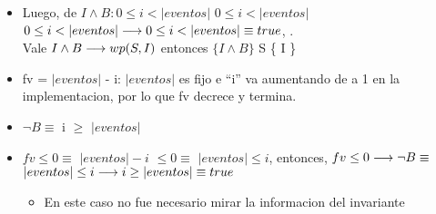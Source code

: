 \documentclass[10pt,a4paper]{article}
\begin{document}
\begin{proof*}
    \begin{itemize}
    \item{%
     Luego, de $I \land B: 0 \leq i < |eventos|$ \hspace{0.2cm}  \hspace{0.2cm} $0 \leq i < |eventos|$ \hspace{0.2cm}  \\
     $0 \leq i < |eventos| \longrightarrow 0 \leq i < |eventos| \equiv true$, \hspace{0.2cm} . \\
     \vspace{0.5cm}
    \hspace{4.2cm} Vale $I \land B \longrightarrow wp(S, I)$ \hspace{0.2cm} entonces \hspace{0.2cm} $\{ I \land B \}$ \hspace{0.1cm}S\hspace{0.1cm} \{ I \}
    }
    \end{itemize}
    \vspace{0.8cm}
    \begin{minipage}{3cm}
    \end{minipage}
    \begin{itemize}
    \vspace{0.2cm}
    \item fv = ${|eventos|}$ - i: ${|eventos|}$ es fijo e ``i'' va aumentando de a 1 en la implementacion, por lo que fv decrece y termina.
    \item $\neg  B \equiv$ \hspace{0.2cm} i \hspace{0.2cm} $\geq$
    \hspace{0.2cm}
    ${|eventos|}$
    \item {$fv \leq 0 \equiv$ \hspace{0.1cm} ${|eventos|} - i$ $\leq 0 \equiv$ \hspace{0.1cm} ${|eventos|} \leq i$}, \hspace{0.2cm} entonces,
    \vspace{0.2cm} $fv \leq 0 \longrightarrow \neg B \equiv$ \vspace{0.2cm} ${|eventos|} \leq i \longrightarrow i \geq {|eventos|} \equiv true$
    \begin{itemize}
              \item En este caso no fue necesario mirar la informacion del invariante

\end{itemize}
\end{itemize}
\end{proof*}
\end{document}
